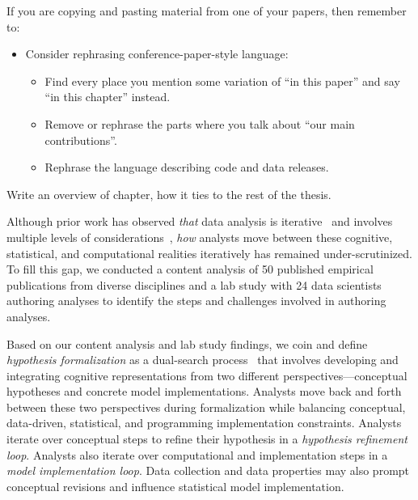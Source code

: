 If you are copying and pasting material from one of your papers, then remember to:
\begin{itemize}
    \item Consider rephrasing conference-paper-style language:
    \begin{itemize}
        \item Find every place you mention some variation of ``in this paper'' and say ``in this chapter'' instead.
        \item Remove or rephrase the parts where you talk about ``our main contributions''.
        \item Rephrase the language describing code and data releases.
    \end{itemize}
\end{itemize}

{\color{orange} Write an overview of chapter, how it ties to the rest of the thesis.}

Although prior work has observed \textit{that} data analysis is
iterative~\cite{liu2019paths,grolemund2014cognitive} and involves multiple
levels of considerations~\cite{liu2019understanding}, \textit{how} analysts move
between these cognitive, statistical, and computational realities iteratively
has remained under-scrutinized. To fill this gap, we conducted a content analysis of 50 published
empirical publications from diverse disciplines and a lab study with 24 data
scientists authoring analyses to identify the steps and challenges involved in
authoring analyses. 

Based on our content analysis and lab study findings, we coin and define
\textit{hypothesis formalization} as a dual-search process~\cite{klahr1988dual}
that involves developing and integrating cognitive representations from two
different perspectives---conceptual hypotheses and concrete model
implementations. Analysts move back and forth between these two perspectives
during formalization while balancing conceptual, data-driven, statistical, and
programming implementation constraints. Analysts iterate over conceptual steps
to refine their hypothesis in a \textit{hypothesis refinement loop}. Analysts
also iterate over computational and implementation steps in a \textit{model
implementation loop}. Data collection and data properties may also prompt
conceptual revisions and influence statistical model implementation.

